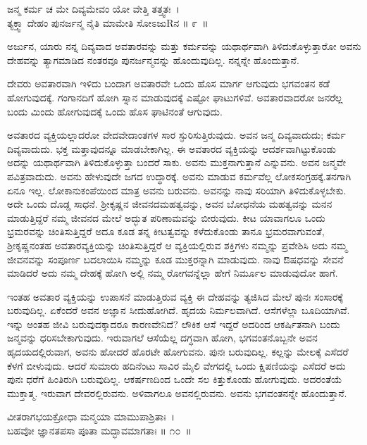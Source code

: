 \begin{shloka}
ಜನ್ಮ ಕರ್ಮ ಚ ಮೇ ದಿವ್ಯಮೇವಂ ಯೋ ವೇತ್ತಿ ತತ್ತ್ವತಃ~।\\ತ್ಯಕ್ತ್ವಾ ದೇಹಂ ಪುನರ್ಜನ್ಮ ನೈತಿ ಮಾಮೇತಿ ಸೋಽಜುRನ \hfill॥ ೯~॥
\end{shloka}

\begin{artha}
ಅರ್ಜುನ, ಯಾರು ನನ್ನ ದಿವ್ಯವಾದ ಅವತಾರವನ್ನು ಮತ್ತು ಕರ್ಮವನ್ನು ಯಥಾರ್ಥವಾಗಿ ತಿಳಿದುಕೊಳ್ಳುತ್ತಾರೋ ಅವನು ದೇಹವನ್ನು ತ್ಯಾಗಮಾಡಿದ ನಂತರವೂ ಪುನರ್ಜನ್ಮವನ್ನು ಹೊಂದುವುದಿಲ್ಲ. ನನ್ನನ್ನೇ ಹೊಂದುತ್ತಾನೆ.
\end{artha}

ದೇವರು ಅವತಾರವಾಗಿ ಇಳಿದು ಬಂದಾಗ ಅವತಾರವೇ ಒಂದು ಹೊಸ ಮಾರ್ಗ ಆಗುವುದು ಭಗವಂತನ ಕಡೆ ಹೋಗುವುದಕ್ಕೆ. ಗಂಗಾನದಿಗೆ ಹೋಗಿ ಸ್ನಾನ ಮಾಡುವುದಕ್ಕೆ ಎಷ್ಟೋ ಘಾಟುಗಳಿವೆ. ಅವತಾರವಾದರೋ ಜನರೆಲ್ಲ ಬಂದು ಮಿಂದು ಹೋಗುವುದಕ್ಕೆ ಒಂದು ಹೊಸ ಘಾಟಿನಂತೆ ಆಗುವುದು.

ಅವತಾರದ ವ್ಯಕ್ತಿಯಲ್ಲಾದರೋ ವೇದವೇದಾಂತಗಳ ಸಾರ ಸ್ಫುರಿಸುತ್ತಿರುವುದು. ಅವನ ಜನ್ಮ ದಿವ್ಯವಾದುದು; ಕರ್ಮ ದಿವ್ಯವಾದುದು. ಭಕ್ತ ಮತ್ತಾವುದನ್ನೂ ಮಾಡಬೇಕಾಗಿಲ್ಲ. ಈ ಅವತಾರದ ವ್ಯಕ್ತಿಯನ್ನು ಆದರ್ಶವಾಗಿಟ್ಟುಕೊಂಡು ಅದನ್ನು ಯಥಾರ್ಥವಾಗಿ ತಿಳಿದುಕೊಳ್ಳುತ್ತಾ ಬಂದರೆ ಸಾಕು. ಅವನು ಮುಕ್ತನಾಗುತ್ತಾನೆ ಎನ್ನುವನು. ಅವನ ಜನ್ಮವೇ ಪವಿತ್ರವಾದುದು. ಅವನು ಹೇಳುವುದೇ ಜಗದ ಉದ್ಧಾರಕ್ಕೆ. ಅವನು ಮಾಡುವ ಕರ್ಮವೆಲ್ಲ ಲೋಕಸಂಗ್ರಹಕ್ಕೆ.\break ತನಗಾಗಿ ಏನೂ ಇಲ್ಲ. ಲೋಕಾನುಕಂಪೆಯಿಂದ ಮಾತ್ರ ಅವನು ಬರುವನು. ಅವನನ್ನು ನಾವು ಸರಿಯಾಗಿ ತಿಳಿದುಕೊಳ್ಳಬೇಕು. ಅದೇ ಒಂದು ದೊಡ್ಡ ಸಾಧನೆ. ಶ‍್ರೀಕೃಷ್ಣನ ಜೀವನದ\break ಮಹತ್ವವನ್ನು, ಅವನ ಬೋಧನೆಯ ಮಹತ್ವವನ್ನು ಮನನ ಮಾಡುತ್ತಿದ್ದರೆ ನಮ್ಮ ಜೀವನದ ಮೇಲೆ ಅದ್ಭುತ ಪರಿಣಾಮವನ್ನು ಬೀರುವುದು. ಕೀಟ ಯಾವಾಗಲೂ ಒಂದು ಭ್ರಮರವನ್ನು ಚಿಂತಿಸುತ್ತಿದ್ದರೆ ಅದೂ ಕೂಡ ತನ್ನ ಕೀಟತ್ವವನ್ನು ಕಳೆದುಕೊಂಡು ತಾನೂ ಭ್ರಮರವಾಗುವಂತೆ, ಶ‍್ರೀಕೃಷ್ಣನಂತಹ ಅವತಾರವ್ಯಕ್ತಿಯನ್ನು ಚಿಂತಿಸುತ್ತಿದ್ದರೆ ಆ ವ್ಯಕ್ತಿಯಲ್ಲಿರುವ ಶಕ್ತಿಗಳು ನಮ್ಮನ್ನು ಪ್ರವೇಶಿಸಿ ಅದು ನಮ್ಮ ಜೀವನವನ್ನು ಸಂಪೂರ್ಣ ಬದಲಾಯಿಸಿ ನಮ್ಮನ್ನು ಕೂಡ ಮುಕ್ತರನ್ನಾಗಿ ಮಾಡುವುದು. ನಾವು ಔಷಧವನ್ನು ಸೇವನೆ ಮಾಡಿದರೆ ಅದು ನಮ್ಮ ದೇಹಕ್ಕೆ ಹೋಗಿ ಅಲ್ಲಿ ನಮ್ಮ ರೋಗವನ್ನೆಲ್ಲಾ ಹೇಗೆ ನಿರ್ಮೂಲ ಮಾಡುವುದೋ ಹಾಗೆ.

ಇಂತಹ ಅವತಾರ ವ್ಯಕ್ತಿಯನ್ನು ಉಪಾಸನೆ ಮಾಡುತ್ತಿರುವ ವ್ಯಕ್ತಿ ಈ ದೇಹವನ್ನು ತ್ಯಜಿಸಿದ ಮೇಲೆ ಪುನಃ ಸಂಸಾರಕ್ಕೆ ಬರುವುದಿಲ್ಲ. ಏಕೆಂದರೆ ಅವನ ಅಜ್ಞಾನ ಸೀದುಹೋಗಿದೆ. ಹೃದಯ ನಿರ್ಮಲವಾಗಿದೆ. ಆಸೆಗಳೆಲ್ಲಾ ಬೂದಿಯಾಗಿವೆ. ಇನ್ನು ಅಂತಹ ಜೀವಿ ಬರುವುದಕ್ಕಾದರೂ ಕಾರಣವೇನಿದೆ? ಲೌಕಿಕ ಆಸೆ ಇದ್ದರೆ ಅದರಿಂದ ಆಕರ್ಷಿತನಾಗಿ ಬಂದು ಜನ್ಮವನ್ನು ಧರಿಸಬೇಕಾಗುವುದು. ಇರುವಾಗಲೆ ಆಸೆಯೆಲ್ಲ ದಗ್ಧವಾಗಿ ಹೋಗಿ, ಭಗವಂತನೊಬ್ಬನೇ ಅವನ ಹೃದಯದಲ್ಲಿರುವಾಗ, ಅವನು ಹೋದರೆ ಹೊರಟೇ ಹೋಗುವನು. ಪುನಃ ಬರುವುದಿಲ್ಲ. ಕಲ್ಲನ್ನು ಮೇಲಕ್ಕೆ ಎಸೆದರೆ ಕೆಳಗೆ ಬೀಳುವುದು. ಆದರೆ ಸುಮಾರು ಹದಿನೆಂಟು ಸಾವಿರ ಮೈಲಿ ವೇಗದಲ್ಲಿ ಒಂದು ಕ್ಷಿಪಣಿಯನ್ನು ಎಸೆದರೆ ಅದು ಪುನಃ ಧರೆಗೆ ಹಿಂತಿರುಗಿ ಬರುವುದಿಲ್ಲ. ಆಕರ್ಷಣದಿಂದ ಒಂದೇ ಸಲ ಕಿತ್ತುಕೊಂಡು ಹೋಗುವುದು. ಅದರಂತೆಯೆ ಮುಕ್ತಾತ್ಮ. ಇರುವಾಗ ದೇವರಲ್ಲಿರುವನು. ಅಳಿವಾಗಲೂ ಅವನಲ್ಲಿರುವನು. ಅವನು ಭಗವಂತನನ್ನೇ ಹೊಂದುತ್ತಾನೆ.

\begin{shloka}
ವೀತರಾಗಭಯಕ್ರೋಧಾ ಮನ್ಮಯಾ ಮಾಮುಪಾಶ್ರಿತಾಃ~।\\ಬಹವೋ ಜ್ಞಾನತಪಸಾ ಪೂತಾ ಮದ್ಭಾವಮಾಗತಾಃ \hfill॥ ೧೦~॥
\end{shloka}

